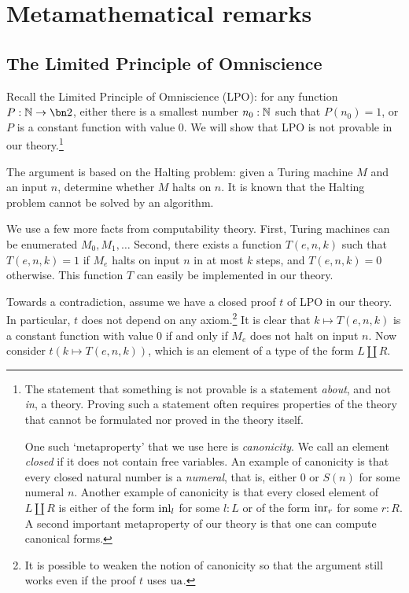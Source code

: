 \chapter{Metamathematical remarks}
\label{app:metamath}

\section{The Limited Principle of Omniscience}
\label{sec:LPO}

\begin{remark}\label{rem:LPO-solves-halting problem}
Recall the Limited Principle of Omniscience (LPO):
  for any function $P:\NN\to\bn 2$, 
  either there is a smallest number $n_0:\mathbb{N}$ such that $P(n_0)=1$,
  or $P$ is a constant function with value $0$.
We will show that LPO is not provable in our theory.\footnote{%
The statement that something is not provable is a statement \emph{about}, 
and not \emph{in}, a theory. Proving such a statement often requires
properties of the theory that cannot be formulated nor proved in the theory itself.

One such `metaproperty' that we use here is \emph{canonicity}.
We call an element \emph{closed} if it does not contain free variables.
An example of canonicity is that every closed natural number is a \emph{numeral},
that is, either $0$ or $S(n)$ for some numeral $n$.
Another example of canonicity is that every closed element of $L\coprod R$
is either of the form $\inl{l}$ for some $l:L$ or 
of the form $\inr{r}$ for some $r:R$.
A second important metaproperty of our theory is that one can compute canonical forms.
}%

The argument is based on the Halting problem: given a Turing machine 
$M$ and an input $n$, determine whether $M$ halts on $n$.
It is known that the Halting problem cannot be solved by an algorithm.

We use a few more facts from computability theory.
First, Turing machines can be enumerated $M_0,M_1,\ldots$
Second, there exists a function $T(e,n,k)$ such that $T(e,n,k) = 1$
if $M_e$ halts on input $n$ in at most $k$ steps, and $T(e,n,k) = 0$
otherwise. This function $T$ can easily be implemented in our theory.

Towards a contradiction, assume we have a closed proof $t$ of LPO in our theory.
In particular, $t$ does not depend on any axiom.\footnote{It is possible to weaken the notion
of canonicity so that the argument still works even if the proof $t$ uses $\ua$.}
It is clear that $k\mapsto T(e,n,k)$ is a constant function with value $0$
if and only if $M_e$ does not halt on input $n$. Now consider $t(k\mapsto T(e,n,k))$,
which is an element of a type of the form $L\coprod R$.


\end{remark}
